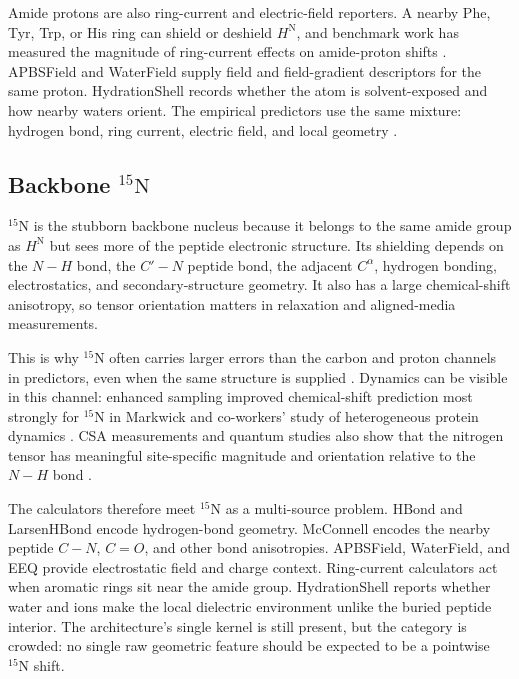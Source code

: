 \documentclass[11pt]{article}
\begin{document}
Amide protons are also ring-current and electric-field reporters. A nearby Phe,
Tyr, Trp, or His ring can shield or deshield \(H^\mathrm N\), and benchmark
work has measured the magnitude of ring-current effects on amide-proton shifts
\cite{christensen2011}. APBSField and WaterField supply field and
field-gradient descriptors for the same proton. HydrationShell records whether
the atom is solvent-exposed and how nearby waters orient. The empirical
predictors use the same mixture: hydrogen bond, ring current, electric field,
and local geometry \cite{neal2003,shenbax2007,han2011}.

\subsection{\texorpdfstring{Backbone \(^{15}\mathrm N\)}
{Backbone 15N}}

\(^{15}\mathrm N\) is the stubborn backbone nucleus because it belongs to the
same amide group as \(H^\mathrm N\) but sees more of the peptide electronic
structure. Its shielding depends on the \(N-H\) bond, the \(C'-N\) peptide
bond, the adjacent \(C^\alpha\), hydrogen bonding, electrostatics, and
secondary-structure geometry. It also has a large chemical-shift anisotropy,
so tensor orientation matters in relaxation and aligned-media measurements.

This is why \(^{15}\mathrm N\) often carries larger errors than the carbon and
proton channels in predictors, even when the same structure is supplied
\cite{shenbax2007,shenbax2010,han2011,larsen2015}. Dynamics can be visible in
this channel: enhanced sampling improved chemical-shift prediction most strongly
for \(^{15}\mathrm N\) in Markwick and co-workers' study of heterogeneous
protein dynamics \cite{markwick2010}. CSA measurements and quantum studies also
show that the nitrogen tensor has meaningful site-specific magnitude and
orientation relative to the \(N-H\) bond \cite{yao2010,brender2001,loth2005}.

The calculators therefore meet \(^{15}\mathrm N\) as a multi-source problem.
HBond and LarsenHBond encode hydrogen-bond geometry. McConnell encodes the
nearby peptide \(C-N\), \(C=O\), and other bond anisotropies. APBSField,
WaterField, and EEQ provide electrostatic field and charge context. Ring-current
calculators act when aromatic rings sit near the amide group. HydrationShell
reports whether water and ions make the local dielectric environment unlike the
buried peptide interior. The architecture's single kernel is still present, but
the category is crowded: no single raw geometric feature should be expected to
be a pointwise \(^{15}\mathrm N\) shift.
\end{document}
